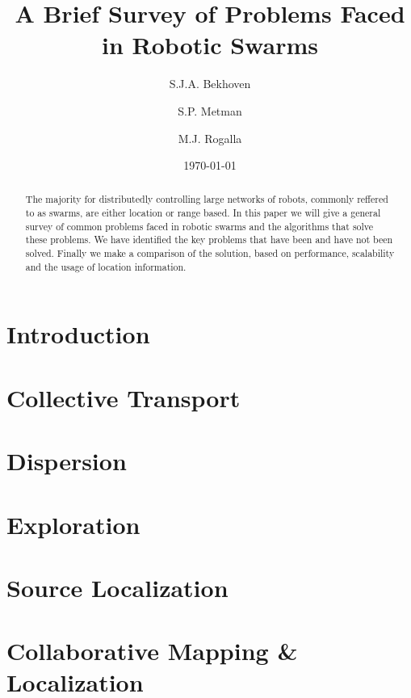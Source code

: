\documentclass[a4paper]{article}
\title{A Brief Survey of Problems Faced \\ in Robotic Swarms}
\author{S.J.A. Bekhoven  \and
    S.P. Metman \and
    M.J. Rogalla}
\date{\today}
\begin{document}
\maketitle
\thispagestyle{empty}

\begin{abstract}
The majority for distributedly controlling large networks of robots, commonly reffered to as swarms, are either location or range based.
In this paper we will give a general survey of common problems faced in robotic swarms and the algorithms that solve these problems.
We have identified the key problems that have been and have not been solved. Finally we make a comparison of the solution, based on performance, scalability and the usage of location information.
\end{abstract}


\section{Introduction}
  

\section{Collective Transport}
\label{sec:CollectiveTransport}
  
  
\section{Dispersion}
  
 
 \section{Exploration}
  
 
 \section{Source Localization}
  
 
 \section{Collaborative Mapping \& Localization}
  
 
\end{document}
